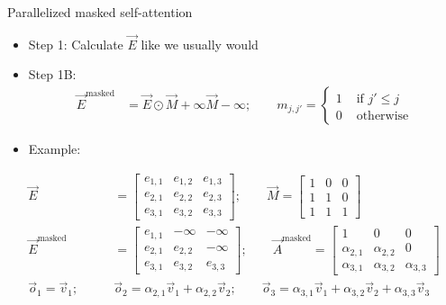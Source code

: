 \begin{vbframe}{Parallelized masked self-attention}

\vfill

\begin{itemize}
\item Step 1: Calculate $\vec E$ like we usually would
\item Step 1B:
$$
\begin{aligned}
\vec E^\mathrm{masked} & = \vec E \odot \vec M + \infty\vec M-\infty; \qquad m_{j,j'} = \begin{cases} 1 & \text{ if } j' \leq j \\ 0 & \text{ otherwise} \end{cases}
\end{aligned}
$$
\item Example:
\end{itemize}
$$
\begin{aligned}
\vec E & = \begin{bmatrix} e_{1,1} & e_{1,2} & e_{1,3} \\ e_{2,1} & e_{2,2} & e_{2,3} \\ e_{3,1} & e_{3,2} & e_{3,3} \end{bmatrix}; \qquad \vec M = \begin{bmatrix} 1 & 0 & 0 \\ 1 & 1 & 0 \\ 1 & 1 & 1 \end{bmatrix} \\
\vec E^\mathrm{masked} & = \begin{bmatrix} e_{1,1} & -\infty & -\infty \\ e_{2,1} & e_{2,2} & -\infty \\ e_{3,1} & e_{3,2} & e_{3,3} \end{bmatrix} ; \qquad \vec A^\mathrm{masked} = \begin{bmatrix} 1 & 0 & 0 \\ \alpha_{2,1} & \alpha_{2,2} & 0 \\ \alpha_{3,1} & \alpha_{3,2} & \alpha_{3,3} \end{bmatrix} \\
\vec o_1 = \vec v_1; \qquad & \vec o_2 = \alpha_{2,1} \vec v_1 + \alpha_{2,2} \vec v_2; \qquad \vec o_3 = \alpha_{3,1} \vec v_1 + \alpha_{3,2} \vec v_2 + \alpha_{3,3} \vec v_3
\end{aligned}
$$

\vfill

\end{vbframe}

